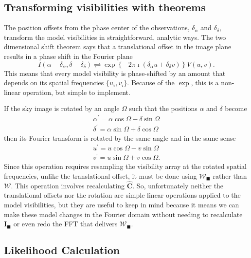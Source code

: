 \documentclass[modern]{aastex62}
\newcommand{\im}{\boldsymbol{I}_\blacksquare}
\newcommand{\vm}{\boldsymbol{\mathcal{W}}} %
\begin{document}
\subsection{Transforming visibilities with theorems}
The position offsets from the phase center of the observations, $\delta_\alpha$ and $\delta_\delta$, transform the model visibilities in straightforward, analytic ways. The two dimensional shift theorem says that a translational offset in the image plane results in a phase shift in the Fourier plane \citep{bracewell00}
\begin{equation}
I(\alpha - \delta_\alpha, \delta - \delta_\delta) \rightleftharpoons \exp \left \{ -2 \pi \imath (\delta_\alpha u + \delta_\delta v) \right \} V(u, v).
\end{equation}
This means that every model visibility is phase-shifted by an amount that depends on its spatial frequencies $\{u_i, v_i\}$. Because of the $\exp$, this is a non-linear operation, but simple to implement.

If the sky image is rotated by an angle $\Omega$ such that the positions $\alpha$ and $\delta$ become
\begin{eqnarray}
\alpha^\prime = \alpha \cos \Omega - \delta \sin \Omega \label{eqn:rota}\\
\delta^\prime = \alpha \sin \Omega + \delta \cos \Omega \label{eqn:rotd}
\end{eqnarray}
then its Fourier transform is rotated by the same angle and in the same sense \citep{bracewell00}
\begin{eqnarray}
u^\prime = u \cos \Omega - v \sin \Omega \label{eqn:rotu}\\
v^\prime = u \sin \Omega + v \cos \Omega. \label{eqn:rotv}
\end{eqnarray}
Since this operation requires resampling the visibility array at the rotated spatial frequencies, unlike the translational offset, it must be done using $\vm_\blacksquare$ rather than $\vm$. This operation involves recalculating $\hat{\boldsymbol{C}}$. So, unfortunately neither the translational offsets nor the rotation are simple linear operations applied to the model visibilities, but they are useful to keep in mind because it means we can make these model changes in the Fourier domain without needing to recalculate $\im$ or even redo the FFT that delivers $\vm_\blacksquare$.

\subsection{Likelihood Calculation}
\end{document}

